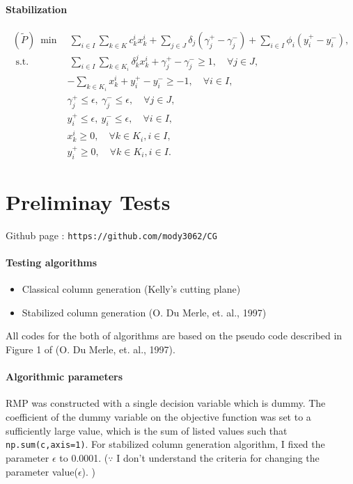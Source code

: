 \documentclass[12pt]{article}
\begin{document}
	\paragraph{Stabilization}
	\begin{align*}
	(\tilde{P})~ \min& ~ \sum _ { i \in I } \sum _ { k \in K } c _ { k } ^ { i } x _ { k } ^ { i } + \sum_{ j \in J }\delta_j (\gamma_j^+ - \gamma_j^-) + \sum_{i \in I}\phi_i(y_i^+ - y_i^-),\\
	\text { s.t. }&  ~ \sum _ { i \in I } \sum _ { k \in K _ { i } } \delta _ { k } ^ { j } x _ { k } ^ { i } + \gamma_j^+ - \gamma_j^- \geq 1 , \quad \forall j \in J, \\
	&- \sum _ { k \in K _ { i } } x _ { k } ^ { i } +y_i^+ - y_i^-\geq - 1 , \quad \forall i \in I ,\\
	& \gamma_j^+ \leq \epsilon , ~ \gamma_j^- \leq \epsilon,\quad \forall j \in J,  \\
	& y_i^+ \leq \epsilon, ~ y_i^-  \leq \epsilon, \quad \forall i \in I, \\
	&x _ { k } ^ { i } \geq 0 , \quad \forall k \in K _ { i } , i \in I,\\
	&y_i^+\geq 0 , \quad \forall k \in K _ { i } , i \in I.
	\end{align*}
	
	\section{Preliminay Tests}
	Github page : \texttt{https://github.com/mody3062/CG}
	\paragraph{Testing algorithms}
	\begin{itemize}
		\item Classical column generation (Kelly's cutting plane)
		\item Stabilized column generation (O. Du Merle, et. al., 1997)
	\end{itemize}
	All codes for the both of algorithms are based on the pseudo code described in Figure 1 of (O. Du Merle, et. al., 1997). 
	
	
	\paragraph{Algorithmic parameters}
	
	RMP was constructed with a single decision variable which is dummy. The coefficient of the dummy variable on the objective function was set to a sufficiently large value, which is the sum of listed values such that \verb|np.sum(c,axis=1)|. For stabilized column generation algorithm, I fixed the parameter $\epsilon$ to 0.0001. ($\because$ I don't understand the criteria for changing the parameter value($\epsilon$). )
	
	
\end{document}
